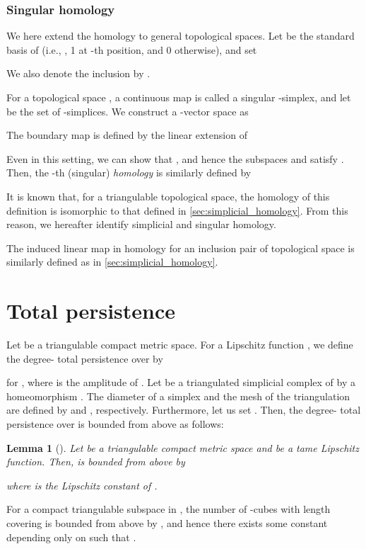 \documentclass{article}
\newtheorem{lem}[thm]{Lemma}
\begin{document}
\subsubsection{Singular homology}\label{sec:singular_homology}
We here extend the homology to general topological spaces.
Let  be the standard basis of  (i.e., , 1 at  -th position, and 0 otherwise), and set

We also denote the inclusion by . 

For a topological space , a continuous map  is called a singular -simplex, and let  be the set of -simplices. 
We construct a -vector space  as 

The boundary map  is defined by the linear extension of


Even in this setting, we can show that , and hence the subspaces  and  satisfy . Then, the -th (singular) {\em homology} is similarly defined by 

It is known that, for a triangulable topological space, the homology of this definition is isomorphic to that defined in 
\ref{sec:simplicial_homology}. From this reason, we hereafter identify simplicial and singular homology. 

The induced linear map in homology for an inclusion pair of topological space  is similarly defined as in \ref{sec:simplicial_homology}. 




\section{Total persistence}
\label{sec:total}

Let  be a triangulable compact metric space.
For a Lipschitz function , we define the degree- total persistence over  by 

for , where  is the amplitude of .
Let  be a triangulated simplicial complex of  by a homeomorphism .
The diameter of a simplex  and the mesh of the triangulation  are defined by  and , respectively.
Furthermore, let us set .
Then, the degree- total persistence over  is bounded from above as follows:
\begin{lem}[\cite{CEHM10}]
Let  be a triangulable compact metric space and  be a tame Lipschitz function.
Then,  is bounded from above by

where  is the Lipschitz constant of .
\end{lem}

For a compact triangulable subspace  in , the number of -cubes with length  covering  is bounded from above by , and hence there exists some constant  depending only on  such that .
\end{document}
